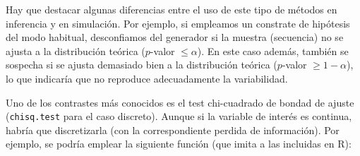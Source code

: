 \documentclass[
]{book}
\theoremstyle{break}
\theoremstyle{definition}
\theoremstyle{definition}
\theoremstyle{definition}
\theoremstyle{definition}
\theoremstyle{remark}
\begin{document}
Hay que destacar algunas diferencias entre el uso de este tipo de métodos en inferencia y en simulación.
Por ejemplo, si empleamos un constrate de hipótesis del modo habitual, desconfiamos del generador si la muestra (secuencia) no se ajusta a la distribución teórica (\(p\)-valor \(\leq \alpha\)).
En este caso además, también se sospecha si se ajusta demasiado
bien a la distribución teórica (\(p\)-valor \(\geq1-\alpha\)),
lo que indicaría que no reproduce adecuadamente la variabilidad.

Uno de los contrastes más conocidos es el test chi-cuadrado de bondad de ajuste
(\texttt{chisq.test} para el caso discreto).
Aunque si la variable de interés es continua, habría que discretizarla
(con la correspondiente perdida de información).
Por ejemplo, se podría emplear la siguiente función
(que imita a las incluidas en R):
\end{document}
